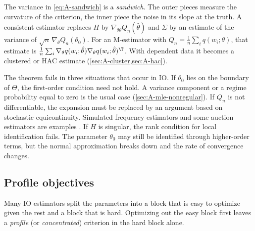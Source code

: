 The variance in \eqref{eq:A-sandwich} is a \emph{sandwich}. The outer pieces measure the curvature of the criterion, the
inner piece the noise in its slope at the truth. A consistent estimator replaces $H$ by $\nabla_{\theta\theta}Q_n(\hat\theta)$
and $\Sigma$ by an estimate of the variance of $\sqrt{n}\,\nabla_\theta Q_n(\theta_0)$. For an M-estimator with
$Q_n = \frac{1}{n}\sum_i q(w_i;\theta)$, that estimate is $\frac{1}{n}\sum_i\nabla_\theta q(w_i;\hat\theta)
\nabla_\theta q(w_i;\hat\theta)^\T$. With dependent data it becomes a clustered or HAC estimate (\cref{sec:A-cluster,sec:A-hac}).

The theorem fails in three situations that occur in IO. If $\theta_0$ lies on the boundary of $\Theta$, the first-order
condition need not hold. A variance component or a regime probability equal to zero is the usual case
(\cref{sec:A-mle-nonregular}). If $Q_n$ is not differentiable, the expansion must be replaced by an argument based on
stochastic equicontinuity. Simulated frequency estimators and some auction estimators are examples
\citep{PakesPollard1989}. If $H$ is singular, the rank condition for local identification fails. The parameter
$\theta_0$ may still be identified through higher-order terms, but the normal approximation breaks down and the rate of
convergence changes.

\subsection{Profile objectives}\label{sec:A-profile}

Many IO estimators split the parameters into a block that is easy to optimize given the rest and a block that is hard.
Optimizing out the easy block first leaves a \emph{profile} (or \emph{concentrated}) criterion in the hard block alone.


